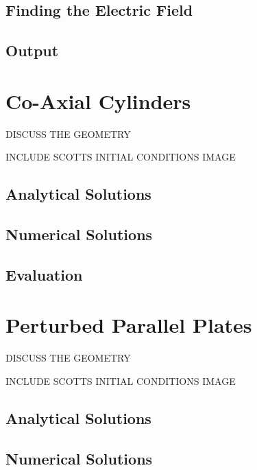 \documentclass{article}
\begin{document}
\subsection{Finding the Electric Field}



\subsection{Output}



\section{Co-Axial Cylinders}

DISCUSS THE GEOMETRY

INCLUDE SCOTTS INITIAL CONDITIONS IMAGE



\subsection{Analytical Solutions}


\subsection{Numerical Solutions}



\subsection{Evaluation}




\section{Perturbed Parallel Plates}

DISCUSS THE GEOMETRY

INCLUDE SCOTTS INITIAL CONDITIONS IMAGE



\subsection{Analytical Solutions}


\subsection{Numerical Solutions}
\end{document}
